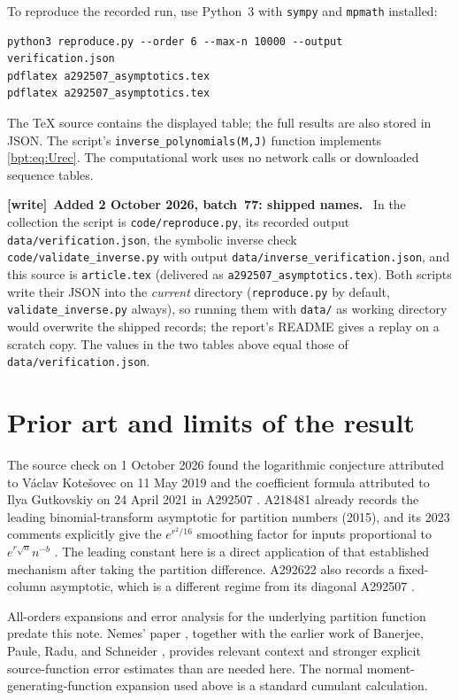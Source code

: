 \documentclass[11pt]{article}
\theoremstyle{remark}\newtheorem{remark}[theorem]{Remark}
\newenvironment{writenote}[1][]{\par\smallskip\begingroup\small
 \noindent\textbf{[write]}\if\relax\detokenize{#1}\relax\else~\textbf{#1.}\fi\ }%
 {\par\endgroup\smallskip}
\begin{document}
To reproduce the recorded run, use Python~3 with \texttt{sympy} and \texttt{mpmath} installed:
\begin{lstlisting}
python3 reproduce.py --order 6 --max-n 10000 --output verification.json
pdflatex a292507_asymptotics.tex
pdflatex a292507_asymptotics.tex
\end{lstlisting}
The TeX source contains the displayed table; the full results are also stored in JSON. The script's \texttt{inverse\_polynomials(M,J)} function implements \eqref{bpt:eq:Urec}. The computational work uses no network calls or downloaded sequence tables.

\begin{writenote}[Added 2 October 2026, batch~77: shipped names]
In the collection the script is \nolinkurl{code/reproduce.py}, its recorded
output \nolinkurl{data/verification.json}, the symbolic inverse check
\nolinkurl{code/validate_inverse.py} with output
\nolinkurl{data/inverse_verification.json}, and this source is
\nolinkurl{article.tex} (delivered as \nolinkurl{a292507_asymptotics.tex}).
Both scripts write their JSON into the \emph{current} directory
(\texttt{reproduce.py} by default, \texttt{validate\_inverse.py} always), so
running them with \nolinkurl{data/} as working directory would overwrite the
shipped records; the report's README gives a replay on a scratch copy. The values in
the two tables above equal those of \nolinkurl{data/verification.json}.
\end{writenote}

\section{Prior art and limits of the result}
The source check on 1 October 2026 found the logarithmic conjecture attributed to V\'aclav Kote\v{s}ovec on 11 May 2019 and the coefficient formula attributed to Ilya Gutkovskiy on 24 April 2021 in A292507 \cite{oeis292507}. A218481 already records the leading binomial-transform asymptotic for partition numbers (2015), and its 2023 comments explicitly give the $e^{r^2/16}$ smoothing factor for inputs proportional to $e^{r\sqrt n}n^{-b}$ \cite{oeis218481}. The leading constant here is a direct application of that established mechanism after taking the partition difference. A292622 also records a fixed-column asymptotic, which is a different regime from its diagonal A292507 \cite{oeis292622}.

All-orders expansions and error analysis for the underlying partition function predate this note. Nemes' paper \cite{nemes}, together with the earlier work of Banerjee, Paule, Radu, and Schneider \cite{bprs}, provides relevant context and stronger explicit source-function error estimates than are needed here. The normal moment-generating-function expansion used above is a standard cumulant calculation.
\end{document}
